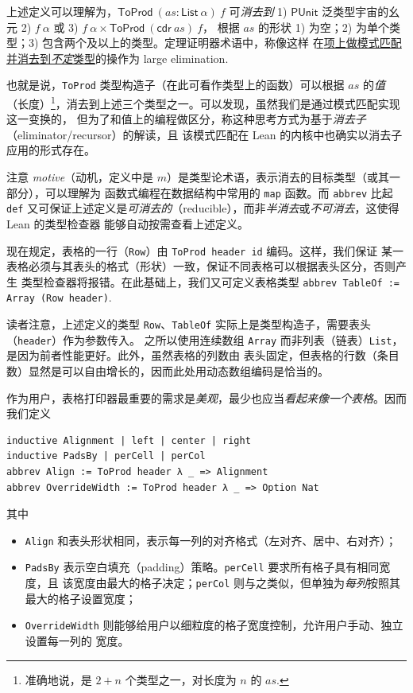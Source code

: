 \documentclass[a4paper, 11pt]{article}
\theoremstyle{remark}\newtheorem*{remark}{Remark}
\theoremstyle{definition}\newtheorem*{definition}{Definition}
\begin{document}
上述定义可以理解为，$\mathsf{ToProd}\ (as : \mathsf{List}\ \alpha)\ f$ 可\emph{消去到} 1) $\mathsf{PUnit}$
泛类型宇宙的幺元 2) $f\ \alpha$ 或 3) $f\ \alpha \times \mathsf{ToProd}\ (\mathsf{cdr}\ as)\ f$，
根据 $as$ 的形状 1) 为空；2) 为单个类型；3) 包含两个及以上的类型。定理证明器术语中，称像这样
在\underline{项上做模式匹配并消去到\emph{不定}类型}的操作为 large elimination.

也就是说，\texttt{ToProd} 类型构造子（在此可看作类型上的函数）可以根据
$as$ 的\emph{值}（长度）\footnote{
准确地说，是 $2 + n$ 个类型之一，对长度为 $n$ 的 $as$.
}，消去到上述三个类型之一。可以发现，虽然我们是通过模式匹配实现这一变换的，
但为了和值上的编程做区分，称这种思考方式为基于\emph{消去子}（eliminator/recursor）的解读，且
该模式匹配在 Lean 的内核中也确实以消去子应用的形式存在。

注意 \emph{motive}（动机，定义中是 $m$）是类型论术语，表示消去的目标类型（或其一部分），可以理解为
函数式编程在数据结构中常用的 \texttt{map} 函数。而 \texttt{abbrev} 比起 \texttt{def}
又可保证上述定义是\emph{可消去的}（reducible），而非\emph{半消去}或\emph{不可消去}，这使得 Lean 的类型检查器
能够自动按需查看上述定义。

现在规定，表格的一行（\texttt{Row}）由 \texttt{ToProd header id} 编码。这样，我们保证
某一表格必须与其表头的格式（形状）一致，保证不同表格可以根据表头区分，否则产生
类型检查器将报错。在此基础上，我们又可定义表格类型 \texttt{abbrev TableOf := Array (Row header)}.

读者注意，上述定义的类型 \texttt{Row}、\texttt{TableOf} 实际上是类型构造子，需要表头（\texttt{header}）作为参数传入。
之所以使用连续数组 \texttt{Array} 而非列表（链表）\texttt{List}，是因为前者性能更好。此外，虽然表格的列数由
表头固定，但表格的行数（条目数）显然是可以自由增长的，因而此处用动态数组编码是恰当的。

作为用户，表格打印器最重要的需求是\emph{美观}，最少也应当\emph{看起来像一个表格}。因而我们定义
\begin{verbatim}
inductive Alignment | left | center | right
inductive PadsBy | perCell | perCol
abbrev Align := ToProd header λ _ => Alignment
abbrev OverrideWidth := ToProd header λ _ => Option Nat
\end{verbatim}
其中
\begin{itemize}\itemsep0em
\item \texttt{Align} 和表头形状相同，表示每一列的对齐格式（左对齐、居中、右对齐）；
\item \texttt{PadsBy} 表示空白填充（padding）策略。\texttt{perCell} 要求所有格子具有相同宽度，且
该宽度由最大的格子决定；\texttt{perCol} 则与之类似，但单独为\emph{每列}按照其最大的格子设置宽度；
\item \texttt{OverrideWidth} 则能够给用户以细粒度的格子宽度控制，允许用户手动、独立设置每一列的
宽度。
\end{itemize}
\end{document}
